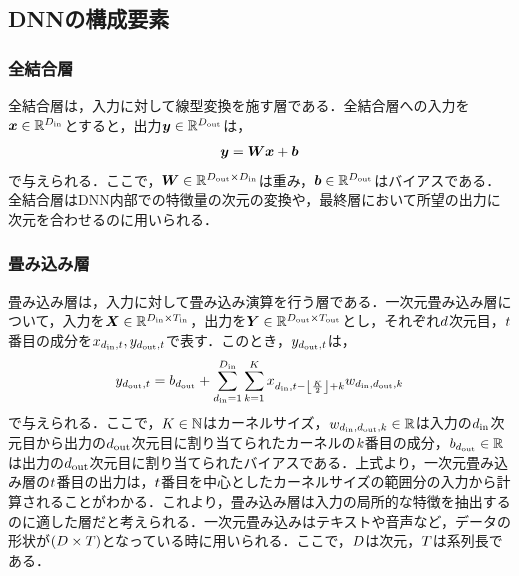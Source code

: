 \documentclass[12pt]{jarticle}
\numberwithin{equation}{section}    %
\numberwithin{figure}{section}      %
\numberwithin{table}{section}      %
\begin{document}
\subsection{DNNの構成要素}
\subsubsection{全結合層}
全結合層は，入力に対して線型変換を施す層である．全結合層への入力を$\bm{x} \in \mathbb{R}^{D_{\text{in}}}$とすると，出力$\bm{y} \in \mathbb{R}^{D_{\text{out}}}$は，
\begin{align}
    \bm{y} = \bm{W}\bm{x} + \bm{b}
\end{align}
で与えられる．ここで，$\bm{W} \in \mathbb{R}^{D_{\text{out}} \times D_{\text{in}}}$は重み，$\bm{b} \in \mathbb{R}^{D_{\text{out}}}$はバイアスである．全結合層はDNN内部での特徴量の次元の変換や，最終層において所望の出力に次元を合わせるのに用いられる．

\subsubsection{畳み込み層}
畳み込み層は，入力に対して畳み込み演算を行う層である．一次元畳み込み層について，入力を$\bm{X} \in \mathbb{R}^{D_{\text{in}} \times T_{\text{in}}}$，出力を$\bm{Y} \in \mathbb{R}^{D_{\text{out}} \times T_{\text{out}}}$とし，それぞれ$d$次元目，$t$番目の成分を$x_{d_{\text{in}}, t}, y_{d_{\text{out}}, t}$で表す．このとき，$y_{d_{\text{out}}, t}$は，
\begin{align}
    y_{d_{\text{out}}, t} = b_{d_{\text{out}}} + \sum_{d_{\text{in}} = 1}^{D_{\text{in}}} \sum_{k = 1}^{K} x_{d_{\text{in}}, t - \left\lfloor \frac{K}{2} \right\rfloor + k} w_{d_{\text{in}}, d_{\text{out}}, k}
\end{align}
で与えられる．ここで，$K \in \mathbb{N}$はカーネルサイズ，$w_{d_{\text{in}}, d_{\text{out}}, k} \in \mathbb{R}$は入力の$d_{\text{in}}$次元目から出力の$d_{\text{out}}$次元目に割り当てられたカーネルの$k$番目の成分，$b_{d_{\text{out}}} \in \mathbb{R}$は出力の$d_{\text{out}}$次元目に割り当てられたバイアスである．上式より，一次元畳み込み層の$t$番目の出力は，$t$番目を中心としたカーネルサイズの範囲分の入力から計算されることがわかる．これより，畳み込み層は入力の局所的な特徴を抽出するのに適した層だと考えられる．一次元畳み込みはテキストや音声など，データの形状が$(D \times T)$となっている時に用いられる．ここで，$D$は次元，$T$は系列長である．
\end{document}
